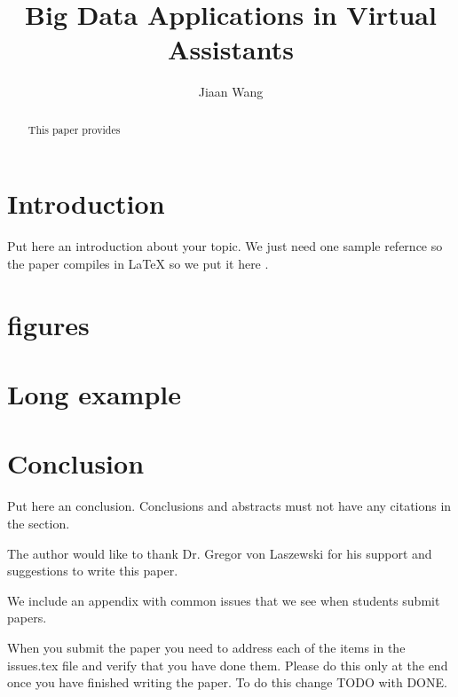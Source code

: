 \title{Big Data Applications in Virtual Assistants}

\author{Jiaan Wang}

\begin{abstract}

    This paper provides
    
\end{abstract}


\maketitle

\section{Introduction}

Put here an introduction about your topic. 
We just need one sample refernce so the paper compiles in LaTeX so we
put it here \cite{Tal2015internet} \cite{Waters2015life} \cite{Elgan2016future} \cite{Hard2014applications} \cite{Mueller2016analytics} \cite{Team2012data} \cite{Marvin2017them} \cite{Kinsbruner2017wants} \cite{Srivastava2016upswing} \cite{Boulton2016assistants} \cite{Simonite2016you} \cite{Etherington2014now} \cite{Baron2017assistants}.

\section{figures}

\section{Long example}

\section{Conclusion}

Put here an conclusion. Conclusions and abstracts must not have any
citations in the section.

\begin{acks}

  The author would like to thank Dr. Gregor von Laszewski for his
  support and suggestions to write this paper.

\end{acks}


 

\appendix

We include an appendix with common issues that we see when students
submit papers.

When you submit the paper you need to address each of the items in the
issues.tex file and verify that you have done them. Please do this
only at the end once you have finished writing the paper. To do this
change TODO with DONE. 
